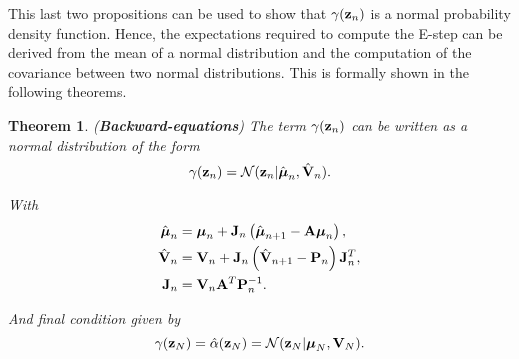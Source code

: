 \documentclass[11pt]{article}
\numberwithin{equation}{section}
\newcommand{\z}{{\bf z}}
\newcommand{\N}{\mathcal{N}}
\newtheorem{theorem}{Theorem}[section]
\begin{document}
This last two propositions can be used to show that $\gamma(\z_n)$ is a normal probability density function. Hence, the expectations required to compute the E-step can be derived from the mean of a normal distribution and the computation of the covariance between two normal distributions. This is formally shown in the following theorems.


\begin{theorem} (\textbf{Backward-equations}) \label{theorem:beta-backward-equations}
	The term $\gamma(\z_n)$ can be written as a normal distribution of the form
	\begin{equation}
		\gamma(\z_n) = \N(\z_n\vert \hat{\boldsymbol\mu}_n, \hat{\bf V}_n).
	\end{equation}
	
	With
	\begin{align}
		\hat{\boldsymbol{\mu}}_n &= \boldsymbol{\mu}_n + {\bf J}_n\left(\hat{\boldsymbol \mu}_{n+1} - {\bf A}\boldsymbol\mu_n\right),\\
		\hat{\bf V}_n &= {\bf V}_n + {\bf J}_n\left(\hat{\bf V}_{n+1} - {\bf P}_n\right){\bf J}_n^T,\\
		{\bf J}_n &= {\bf V}_n{\bf A}^T{\bf P}_n^{-1}.
	\end{align}
	
	And final condition given by
	\begin{equation}
		\gamma(\z_N) = \hat\alpha(\z_N) = \N(\z_N\vert \boldsymbol\mu_N, {\bf V}_N).
	\end{equation}
\end{theorem}
\end{document}
